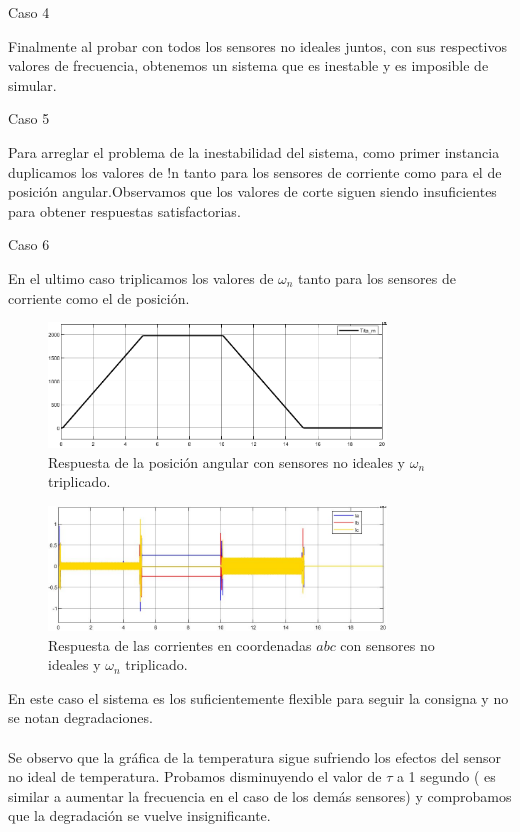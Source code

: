 \documentclass{article}
\begin{document}
\bullet Caso 4

Finalmente al probar con todos los sensores no ideales juntos, con sus respectivos valores de frecuencia, 
obtenemos un sistema que es inestable y es imposible de simular.

\bullet Caso 5

Para arreglar el problema de la inestabilidad del sistema, como primer instancia duplicamos los valores de !n tanto para
los sensores de corriente como para el de posición angular.Observamos que los valores de corte siguen siendo insuficientes para obtener respuestas satisfactorias.

\bullet Caso 6

En el ultimo caso triplicamos los valores de $\omega_n$ tanto para los sensores de corriente como el de posición.

\begin{figure}[H]
    \centering
    \includegraphics[width=0.8\textwidth]{5.2.5.d.7.png}
    \caption{Respuesta de la posición angular con sensores no ideales y $\omega_n$ triplicado.}
\end{figure}

\begin{figure}[H]
    \centering
    \includegraphics[width=0.8\textwidth]{5.2.5.d.8.png}
    \caption{Respuesta de las corrientes en coordenadas $abc$ con sensores no ideales y $\omega_n$ triplicado.}
\end{figure}

En este caso el sistema es los suficientemente flexible para seguir la consigna y no se notan degradaciones.
\\\\
\indent Se observo que la gráfica de la temperatura sigue sufriendo los efectos del sensor no ideal de 
temperatura. Probamos disminuyendo el valor de $\tau$ a 1 segundo ( es similar a aumentar la 
frecuencia en el caso de los demás sensores) y comprobamos que la degradación se vuelve 
insignificante.
\end{document}
